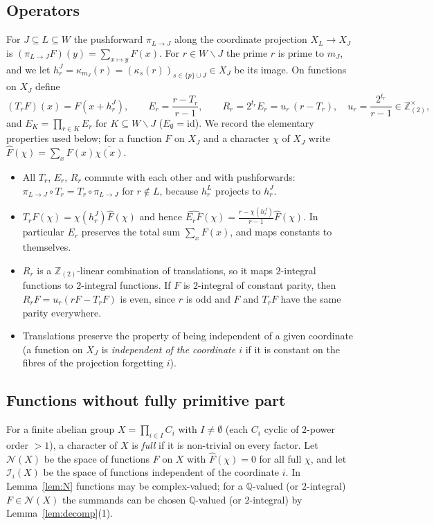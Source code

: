 \documentclass[11pt]{amsart}
\theoremstyle{definition}
\theoremstyle{remark}
\providecommand{\Q}{\mathbb Q}
\newcommand{\Zt}{\mathbb Z_{(2)}}
\newcommand{\Nn}{\mathcal N}
\numberwithin{equation}{section}
\begin{document}
\subsection{Operators}
For $J\subseteq L\subseteq W$ the pushforward $\pi_{L\to J}$ along the coordinate projection $X_L\to X_J$ is $(\pi_{L\to J}F)(y)=\sum_{x\mapsto y}F(x)$.
For $r\in W\smallsetminus J$ the prime $r$ is prime to $m_J$, and we let $h^J_r=\kappa_{m_J}(r)=(\kappa_s(r))_{s\in\{p\}\cup J}\in X_J$ be its image.
On functions on $X_J$ define
\[
(T_rF)(x)=F(x+h^J_r),\qquad E_r=\frac{r-T_r}{r-1},\qquad R_r=2^{t_r}E_r=u_r\,(r-T_r),\quad u_r=\frac{2^{t_r}}{r-1}\in\Zt^\times,
\]
and $E_K=\prod_{r\in K}E_r$ for $K\subseteq W\smallsetminus J$ ($E_\emptyset=\mathrm{id}$).
We record the elementary properties used below; for a function $F$ on $X_J$ and a character $\chi$ of $X_J$ write $\widehat F(\chi)=\sum_xF(x)\overline{\chi(x)}$.
\begin{itemize}
\item[(O1)] All $T_r$, $E_r$, $R_r$ commute with each other and with pushforwards: $\pi_{L\to J}\circ T_r=T_r\circ\pi_{L\to J}$ for $r\notin L$, because $h^L_r$ projects to $h^J_r$.
\item[(O2)] $\widehat{T_rF}(\chi)=\chi(h^J_r)\widehat F(\chi)$ and hence $\widehat{E_rF}(\chi)=\frac{r-\chi(h^J_r)}{r-1}\widehat F(\chi)$. In particular $E_r$ preserves the total sum $\sum_xF(x)$, and maps constants to themselves.
\item[(O3)] $R_r$ is a $\Zt$-linear combination of translations, so it maps $2$-integral functions to $2$-integral functions. If $F$ is $2$-integral of constant parity, then $R_rF=u_r(rF-T_rF)$ is even, since $r$ is odd and $F$ and $T_rF$ have the same parity everywhere.
\item[(O4)] Translations preserve the property of being independent of a given coordinate (a function on $X_J$ is \emph{independent of the coordinate $i$} if it is constant on the fibres of the projection forgetting $i$).
\end{itemize}

\subsection{Functions without fully primitive part}
For a finite abelian group $X=\prod_{i\in I}C_i$ with $I\neq\emptyset$ (each $C_i$ cyclic of $2$-power order $>1$), a character of $X$ is \emph{full} if it is non-trivial on every factor.
Let $\Nn(X)$ be the space of functions $F$ on $X$ with $\widehat F(\chi)=0$ for all full $\chi$, and let $\mathcal I_i(X)$ be the space of functions independent of the coordinate $i$.
In Lemma~\ref{lem:N} functions may be complex-valued; for a $\Q$-valued (or $2$-integral) $F\in\Nn(X)$ the summands can be chosen $\Q$-valued (or $2$-integral) by Lemma~\ref{lem:decomp}(1).
\end{document}
